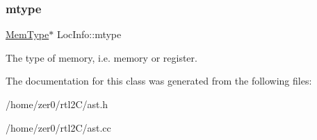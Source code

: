 \subsubsection{\texorpdfstring{mtype}{mtype}}
{\footnotesize\ttfamily \hyperlink{class_mem_type}{Mem\+Type}$\ast$ Loc\+Info\+::mtype\hspace{0.3cm}{\ttfamily [protected]}}

The type of memory, i.\+e. memory or register. 

The documentation for this class was generated from the following files\+:\begin{DoxyCompactItemize}
\item 
/home/zer0/rtl2\+C/ast.\+h\item 
/home/zer0/rtl2\+C/ast.\+cc\end{DoxyCompactItemize}
